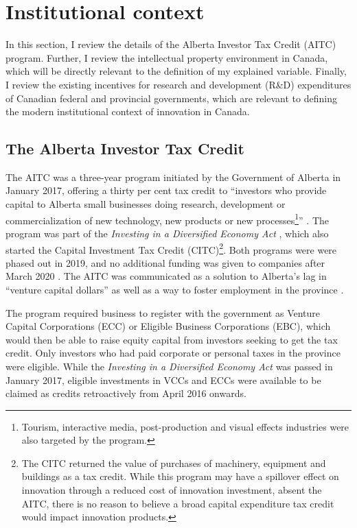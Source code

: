 \documentclass[../main.tex]{subfiles}
\begin{document}
\section{Institutional context}
\label{sec:institutional_background}

In this section, I review the details of the Alberta Investor Tax Credit (AITC) program. Further, I review the intellectual property environment in Canada, which will be directly relevant to the definition of my explained variable. Finally, I review the existing incentives for research and development (R\&D) expenditures of Canadian federal and provincial governments, which are relevant to defining the modern institutional context of innovation in Canada.

\subsection{The Alberta Investor Tax Credit}

The AITC was a three-year program initiated by the Government of Alberta in January 2017, offering a thirty per cent tax credit to \enquote{investors who provide capital to Alberta small businesses doing research, development or commercialization of new technology, new products or new processes\footnote{Tourism, interactive media, post-production and visual effects industries were also targeted by the program.}} \parencite[p.1]{albertaeconomicdevelopmentandtrade17}. The program was part of the \textit{Investing in a Diversified Economy Act} \nocite{Investing16}, which also started the Capital Investment Tax Credit (CITC)\footnote{The CITC returned the value of purchases of machinery, equipment and buildings as a tax credit. While this program may have a spillover effect on innovation through a reduced cost of innovation investment, absent the AITC, there is no reason to believe a broad capital expenditure tax credit would impact innovation products.}. Both programs were were phased out in 2019, and no additional funding was given to companies after March 2020 \parencite{albertaeconomicdevelopmentandtrade19}. The AITC was communicated as a solution to Alberta's lag in \enquote{venture capital dollars} \parencite[p.1]{albertaeconomicdevelopmentandtrade17} as well as a way to foster employment in the province \parencite{zabjeck16}.

The program required business to register with the government as Venture Capital Corporations (ECC) or Eligible Business Corporations (EBC), which would then be able to raise equity capital from investors seeking to get the tax credit. Only investors who had paid corporate or personal taxes in the province were eligible. While the \textit{Investing in a Diversified Economy Act} was passed in January 2017, eligible investments in VCCs and ECCs were available to be claimed as credits retroactively from April 2016 onwards.
\end{document}
